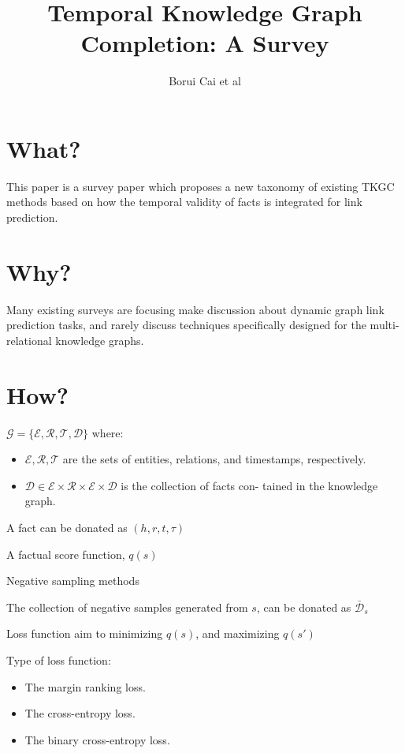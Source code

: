 \documentclass[12pt]{article}
\begin{document}
\title{Temporal Knowledge Graph Completion: A Survey}
\author{Borui Cai et al}
\maketitle

\section{What?}

This paper is a survey paper which proposes a new taxonomy of existing TKGC methods based
on how the temporal validity of facts is integrated for link prediction.

\section{Why?}

Many existing surveys are focusing make discussion about dynamic graph link prediction tasks,
and rarely discuss techniques specifically designed for the multi-relational knowledge graphs.

\section{How?}


$\mathcal{G} = \{\mathcal{E}, \mathcal{R}, \mathcal{T}, \mathcal{D}\}$
where:
\begin{itemize}
    \item $\mathcal{E}, \mathcal{R}, \mathcal{T}$ are the sets of entities, relations, and timestamps, respectively.
    \item $\mathcal{D} \in \mathcal{E} \times \mathcal{R} \times \mathcal{E} \times \mathcal{D}$ is the collection of facts con-
    tained in the knowledge graph.
\end{itemize}

A fact can be donated as $(h, r, t, \tau )$

A factual score function, $q(s)$

Negative sampling methods 


The collection of negative samples generated from $s$, can be donated as $\bar{\mathcal{D}}_{s}$

Loss function aim to minimizing $q(s)$, and maximizing $q(s')$

Type of loss function:
\begin{itemize}
    \item The margin ranking loss.
    \item The cross-entropy loss.
    \item The binary cross-entropy loss.
\end{itemize}
\end{document}
